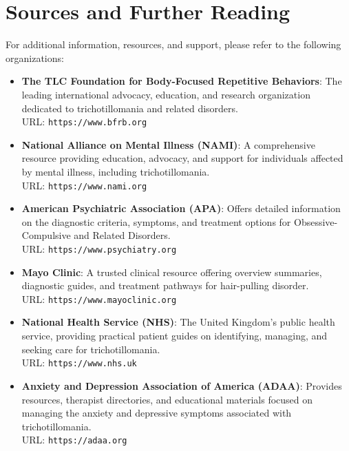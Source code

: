 \section*{Sources and Further Reading}
For additional information, resources, and support, please refer to the following organizations:

\begin{itemize}
    \item \textbf{The TLC Foundation for Body-Focused Repetitive Behaviors}: The leading international advocacy, education, and research organization dedicated to trichotillomania and related disorders. \\ URL: \texttt{https://www.bfrb.org}
    \item \textbf{National Alliance on Mental Illness (NAMI)}: A comprehensive resource providing education, advocacy, and support for individuals affected by mental illness, including trichotillomania. \\ URL: \texttt{https://www.nami.org}
    \item \textbf{American Psychiatric Association (APA)}: Offers detailed information on the diagnostic criteria, symptoms, and treatment options for Obsessive-Compulsive and Related Disorders. \\ URL: \texttt{https://www.psychiatry.org}
    \item \textbf{Mayo Clinic}: A trusted clinical resource offering overview summaries, diagnostic guides, and treatment pathways for hair-pulling disorder. \\ URL: \texttt{https://www.mayoclinic.org}
    \item \textbf{National Health Service (NHS)}: The United Kingdom's public health service, providing practical patient guides on identifying, managing, and seeking care for trichotillomania. \\ URL: \texttt{https://www.nhs.uk}
    \item \textbf{Anxiety and Depression Association of America (ADAA)}: Provides resources, therapist directories, and educational materials focused on managing the anxiety and depressive symptoms associated with trichotillomania. \\ URL: \texttt{https://adaa.org}
\end{itemize}